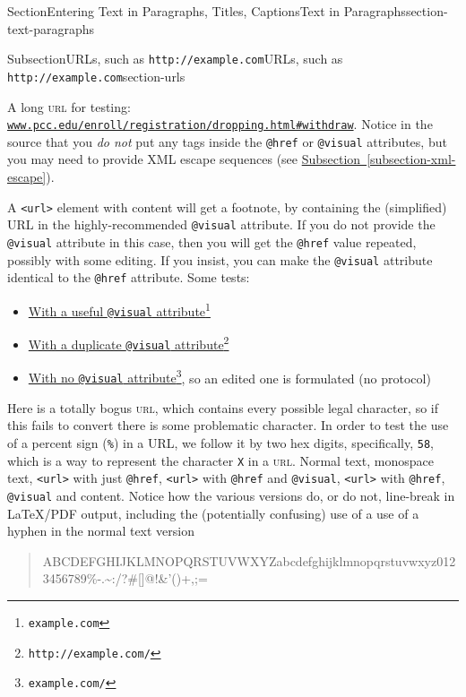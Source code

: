\documentclass[twoside,10pt,]{article}
\newcommand{\xreffont}{\relax}
\newcommand{\mono}[1]{\texttt{#1}}
\newcommand{\initialism}[1]{\textsc{\MakeLowercase{#1}}}
\numberwithin{equation}{section}
\begin{document}
\begin{sectionptx}{Section}{Entering Text in Paragraphs, Titles, Captions}{}{Text in Paragraphs}{}{}{section-text-paragraphs}
\begin{subsectionptx}{Subsection}{URLs, such as \mono{http://example.com}}{}{URLs, such as \mono{http://example.com}}{}{}{section-urls}
\par
A long \initialism{URL} for testing:  \href{http://www.pcc.edu/enroll/registration/dropping.html\#withdraw}{\nolinkurl{www.pcc.edu/enroll/registration/dropping.html\#withdraw}}.  Notice in the source that you \emph{do not} put any tags inside the \mono{@href} or \mono{@visual} attributes, but you may need to provide XML escape sequences (see \hyperref[subsection-xml-escape]{Subsection~{\xreffont\ref{subsection-xml-escape}}}).%
\par
A \mono{<url>} element with content will get a footnote, by containing the (simplified) URL in the highly-recommended \mono{@visual} attribute.  If you do not provide the \mono{@visual} attribute in this case, then you will get the \mono{@href} value repeated, possibly with some editing.  If you insist, you can make the \mono{@visual} attribute identical to the \mono{@href} attribute.  Some tests:%
\begin{itemize}[label=\textbullet]
\item{}\href{http://example.com/}{With a useful \mono{@visual} attribute}\footnote{\nolinkurl{example.com}\label{section-urls-6-7-1-2}}%
\item{}\href{http://example.com/}{With a duplicate \mono{@visual} attribute}\footnote{\nolinkurl{http://example.com/}\label{section-urls-6-7-2-2}}%
\item{}\href{http://example.com/}{With no \mono{@visual} attribute}\footnote{\nolinkurl{example.com/}\label{section-urls-6-7-3-2}}, so an edited one is formulated (no protocol)%
\end{itemize}
%
\par
Here is a totally bogus \initialism{URL}, which contains every possible legal character, so if this fails to convert there is some problematic character.  In order to test the use of a percent sign (\mono{\%}) in a URL, we follow it by two hex digits, specifically, \mono{58}, which is a way to represent the character \mono{X} in a \initialism{URL}.  Normal text, monospace text, \mono{<url>} with just \mono{@href}, \mono{<url>} with \mono{@href} and \mono{@visual}, \mono{<url>} with \mono{@href}, \mono{@visual} and content.  Notice how the various versions do, or do not, line-break in \LaTeX{}\slash{}PDF output, including the (potentially confusing) use of a use of a hyphen in the normal text version%
\begin{quote}%
ABCDEFGHIJKLMNOPQRSTUVWXYZabcdefghijklmnopqrstuvwxyz0123456789\%-.\textunderscore{}\textasciitilde{}:\slash{}?\#[]@!\textdollar{}\&'()\textasteriskcentered{}+,;=%

\end{quote}
\end{subsectionptx}
\end{sectionptx}
\end{document}

